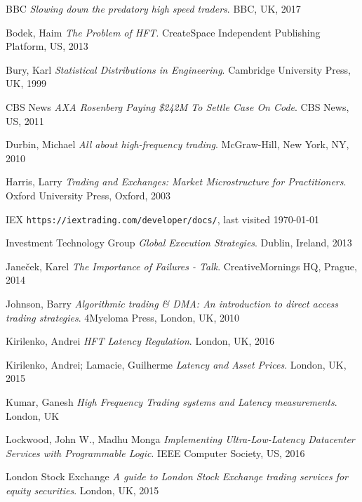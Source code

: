 \documentclass[12pt]{article}
\begin{document}
\pagebreak
\begin{thebibliography}{9}

%

BBC 
\textit{Slowing down the predatory high speed traders}.
BBC, UK, 2017

Bodek, Haim
\textit{The Problem of HFT}.
CreateSpace Independent Publishing Platform, US, 2013

Bury, Karl
\textit{Statistical Distributions in Engineering}.
Cambridge University Press, UK, 1999

CBS News
\textit{AXA Rosenberg Paying \$242M To Settle Case On Code}.
CBS News, US, 2011

Durbin, Michael
\textit{All about high-frequency trading}.
McGraw-Hill, New York, NY, 2010

Harris, Larry
\textit{Trading and Exchanges: Market Microstructure for Practitioners}.
Oxford University Press, Oxford, 2003

IEX
\texttt{https://iextrading.com/developer/docs/}, last visited \today

Investment Technology Group
\textit{Global Execution Strategies}.
Dublin, Ireland, 2013

Janeček, Karel
\textit{The Importance of Failures - Talk}.
CreativeMornings HQ, Prague, 2014

Johnson, Barry
\textit{Algorithmic trading \& DMA: An introduction to direct access trading strategies}.
4Myeloma Press, London, UK, 2010

Kirilenko, Andrei
\textit{HFT Latency Regulation}.
London, UK, 2016

Kirilenko, Andrei; Lamacie, Guilherme
\textit{Latency and Asset Prices}.
London, UK, 2015

Kumar, Ganesh
\textit{High Frequency Trading systems and Latency measurements}.
London, UK

Lockwood, John W., Madhu Monga
\textit{Implementing Ultra-Low-Latency Datacenter Services with Programmable Logic}.
IEEE Computer Society, US, 2016

London Stock Exchange
\textit{A guide to London Stock Exchange 
trading services for equity securities}.
London, UK, 2015


\end{thebibliography}
\end{document}
